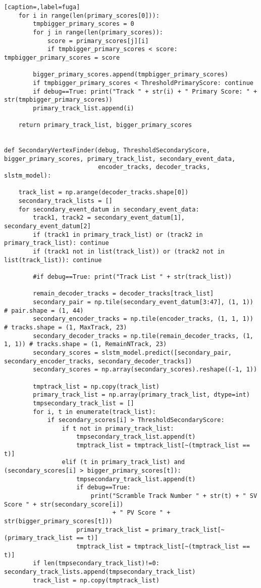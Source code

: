 \begin{lstlisting}[caption=,label=fuga]
    for i in range(len(primary_scores[0])): 
        tmpbigger_primary_scores = 0
        for j in range(len(primary_scores)):
            score = primary_scores[j][i]
            if tmpbigger_primary_scores < score: tmpbigger_primary_scores = score
        
        bigger_primary_scores.append(tmpbigger_primary_scores)
        if tmpbigger_primary_scores < ThresholdPrimaryScore: continue
        if debug==True: print("Track " + str(i) + " Primary Score: " + str(tmpbigger_primary_scores))
        primary_track_list.append(i)

    return primary_track_list, bigger_primary_scores


def SecondaryVertexFinder(debug, ThresholdSecondaryScore, bigger_primary_scores, primary_track_list, secondary_event_data, 
                          encoder_tracks, decoder_tracks, slstm_model):

    track_list = np.arange(decoder_tracks.shape[0])
    secondary_track_lists = []
    for secondary_event_datum in secondary_event_data:
        track1, track2 = secondary_event_datum[1], secondary_event_datum[2]
        if (track1 in primary_track_list) or (track2 in primary_track_list): continue
        if (track1 not in list(track_list)) or (track2 not in list(track_list)): continue

        #if debug==True: print("Track List " + str(track_list))
        
        remain_decoder_tracks = decoder_tracks[track_list]
        secondary_pair = np.tile(secondary_event_datum[3:47], (1, 1)) # pair.shape = (1, 44)
        secondary_encoder_tracks = np.tile(encoder_tracks, (1, 1, 1)) # tracks.shape = (1, MaxTrack, 23)
        secondary_decoder_tracks = np.tile(remain_decoder_tracks, (1, 1, 1)) # tracks.shape = (1, RemainNTrack, 23)
        secondary_scores = slstm_model.predict([secondary_pair, secondary_encoder_tracks, secondary_decoder_tracks])
        secondary_scores = np.array(secondary_scores).reshape((-1, 1))

        tmptrack_list = np.copy(track_list)
        primary_track_list = np.array(primary_track_list, dtype=int)
        tmpsecondary_track_list = []
        for i, t in enumerate(track_list):
            if secondary_scores[i] > ThresholdSecondaryScore:
                if t not in primary_track_list:
                    tmpsecondary_track_list.append(t)
                    tmptrack_list = tmptrack_list[~(tmptrack_list == t)]
                elif (t in primary_track_list) and (secondary_scores[i] > bigger_primary_scores[t]):
                    tmpsecondary_track_list.append(t)
                    if debug==True:
                        print("Scramble Track Number " + str(t) + " SV Score " + str(secondary_score[i]) 
                              + " PV Score " + str(bigger_primary_scores[t]))
                    primary_track_list = primary_track_list[~(primary_track_list == t)]
                    tmptrack_list = tmptrack_list[~(tmptrack_list == t)]
        if len(tmpsecondary_track_list)!=0: secondary_track_lists.append(tmpsecondary_track_list)
        track_list = np.copy(tmptrack_list)


\end{lstlisting}
